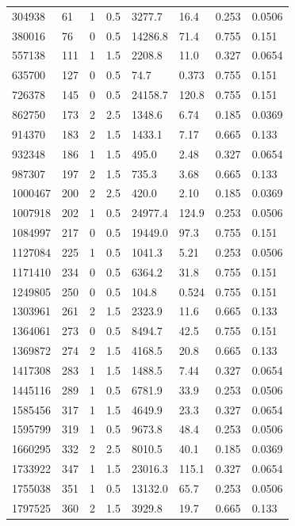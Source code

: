 \documentclass[preview]{standalone}
\begin{document}
{{\begin{tabular}{L{1.2cm}C{1.2cm} C{0.3cm}C{0.5cm} C{1.4cm}C{1.4cm} C{1.4cm}C{1.4cm}}
  304938  &    61  & 1     & 0.5 &  3277.7  & 16.4  & 0.253 &  0.0506   \\ 
  380016  &    76  & 0     & 0.5 &  14286.8  & 71.4  & 0.755 &  0.151   \\ 
  557138  &   111  & 1     & 1.5 &  2208.8  & 11.0  & 0.327 &  0.0654   \\ 
  635700  &   127  & 0     & 0.5 &  74.7  & 0.373  & 0.755 &  0.151   \\ 
  726378  &   145  & 0     & 0.5 &  24158.7  & 120.8  & 0.755 &  0.151   \\ 
  862750  &   173  & 2     & 2.5 &  1348.6  & 6.74  & 0.185 &  0.0369   \\ 
  914370  &   183  & 2     & 1.5 &  1433.1  & 7.17  & 0.665 &  0.133   \\ 
  932348  &   186  & 1     & 1.5 &  495.0  & 2.48  & 0.327 &  0.0654   \\ 
  987307  &   197  & 2     & 1.5 &  735.3  & 3.68  & 0.665 &  0.133   \\ 
  1000467  &   200  & 2     & 2.5 &  420.0  & 2.10  & 0.185 &  0.0369   \\ 
  1007918  &   202  & 1     & 0.5 &  24977.4  & 124.9  & 0.253 &  0.0506   \\ 
  1084997  &   217  & 0     & 0.5 &  19449.0  & 97.3  & 0.755 &  0.151   \\ 
  1127084  &   225  & 1     & 0.5 &  1041.3  & 5.21  & 0.253 &  0.0506   \\ 
  1171410  &   234  & 0     & 0.5 &  6364.2  & 31.8  & 0.755 &  0.151   \\ 
  1249805  &   250  & 0     & 0.5 &  104.8  & 0.524  & 0.755 &  0.151   \\ 
  1303961  &   261  & 2     & 1.5 &  2323.9  & 11.6  & 0.665 &  0.133   \\ 
  1364061  &   273  & 0     & 0.5 &  8494.7  & 42.5  & 0.755 &  0.151   \\ 
  1369872  &   274  & 2     & 1.5 &  4168.5  & 20.8  & 0.665 &  0.133   \\ 
  1417308  &   283  & 1     & 1.5 &  1488.5  & 7.44  & 0.327 &  0.0654   \\ 
  1445116  &   289  & 1     & 0.5 &  6781.9  & 33.9  & 0.253 &  0.0506   \\ 
  1585456  &   317  & 1     & 1.5 &  4649.9  & 23.3  & 0.327 &  0.0654   \\ 
  1595799  &   319  & 1     & 0.5 &  9673.8  & 48.4  & 0.253 &  0.0506   \\ 
  1660295  &   332  & 2     & 2.5 &  8010.5  & 40.1  & 0.185 &  0.0369   \\ 
  1733922  &   347  & 1     & 1.5 &  23016.3  & 115.1  & 0.327 &  0.0654   \\ 
  1755038  &   351  & 1     & 0.5 &  13132.0  & 65.7  & 0.253 &  0.0506   \\ 
  1797525  &   360  & 2     & 1.5 &  3929.8  & 19.7  & 0.665 &  0.133   \\ 
\hline 
\end{tabular} 

}}
\end{document}
